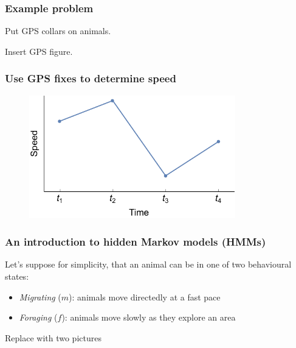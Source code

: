 \documentclass{beamer}
\begin{document}
\begin{frame}
\frametitle{Example problem}
Put GPS collars on animals.

Insert GPS figure.
    
\end{frame}

\begin{frame}
\frametitle{Use GPS fixes to determine speed}

\begin{figure}
    \centering
    \includegraphics[width=0.8\textwidth]{figures/hmm_time_series.pdf}
\end{figure}
    
\end{frame}

\begin{frame}
\frametitle{An introduction to hidden Markov models (HMMs)}

Let's suppose for simplicity, that an animal can be in one of two behavioural states:

\vspace{0.5cm}

\begin{itemize}
    \item \textit{Migrating} ($m$): animals move directedly at a fast pace
    \item \textit{Foraging} ($f$): animals move slowly as they explore an area
\end{itemize}

\vspace{0.5cm}

Replace with two pictures
    
\end{frame}
\end{document}
